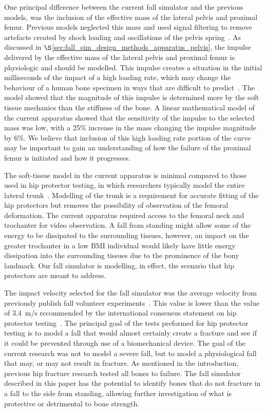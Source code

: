 One principal difference between the current fall simulator and the previous models, was the inclusion of the effective mass of the lateral pelvis and proximal femur.
Previous models neglected this mass and used signal filtering to remove artefacts created by shock loading and oscillations of the pelvis spring~\citep{robinovitch_force_1995, robinovitch_hip_2009}.
As discussed in $\S$\ref{sec:fall_sim_design_methods_apparatus_pelvis}, the impulse delivered by the effective mass of the lateral pelvis and proximal femur is physiologic and should be modelled.
This impulse creates a situation in the initial milliseconds of the impact of a high loading rate, which may change the behaviour of a human bone specimen in ways that are difficult to predict~\citep{mcelhaney_dynamic_1966, crowninshield_response_1974, robertson_compressive_1978, courtney_effects_1994, pithioux_comparison_2004, hansen_effect_2008, zioupos_microcracking_2008}.
The model showed that the magnitude of this impulse is determined more by the soft tissue mechanics than the stiffness of the bone.
A linear mathematical model of the current apparatus showed that the sensitivity of the impulse to the selected mass was low, with a 25\% increase in the mass changing the impulse magnitude by 6\%.
We believe that inclusion of this high loading rate portion of the curve may be important to gain an understanding of how the failure of the proximal femur is initiated and how it progresses.

The soft-tissue model in the current apparatus is minimal compared to those used in hip protector testing, in which researchers typically model the entire lateral trunk~\citep{laing_force_2008}.
Modelling of the trunk is a requirement for accurate fitting of the hip protectors but removes the possibility of observation of the femoral deformation.
The current apparatus required access to the femoral neck and trochanter for video observation.
A fall from standing might allow some of the energy to be dissipated to the surrounding tissues, however, an impact on the greater trochanter in a low BMI individual would likely have little energy dissipation into the surrounding tissues due to the prominence of the bony landmark.
Our fall simulator is modelling, in effect, the scenario that hip protectors are meant to address.

The impact velocity selected for the fall simulator was the average velocity from previously publish fall volunteer experiments~\citep{feldman_reducing_2007}.
This value is lower than the value of 3.4~\ac{m}/\ac{s} recommended by the international consensus statement on hip protector testing~\citep{robinovitch_hip_2009}.
The principal goal of the tests preformed for hip protector testing is to model a fall that would almost certainly create a fracture and see if it could be prevented through use of a biomechanical device.
The goal of the current research was not to model a severe fall, but to model a physiological fall that may, or may not result in fracture.
As mentioned in the introduction, previous hip fracture research tested all bones to failure.
The fall simulator described in this paper has the potential to identify bones that do not fracture in a fall to the side from standing, allowing further investigation of what is protective or detrimental to bone strength.

